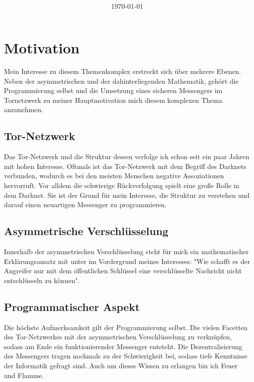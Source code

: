 \documentclass[a4paper,10pt,ngerman,
  headheight=28pt,]{scrartcl}
\title{\textbf{\Huge\Titel}}
\subtitle{\textbf{\Huge\SubTitel}}
\author{\LARGE \Author \\\\}
\author{\LARGE \School \\\\}
\date{\LARGE\today}
\begin{document}
\maketitle
\tableofcontents
\setcounter{page}{0}

\vspace{0.5cm}
\pagebreak

\linenumbers
\modulolinenumbers[5]

\section{Motivation}
Mein Interesse zu diesem Themenkomplex erstreckt sich über mehrere Ebenen. Neben der asymmetrischen und der dahinterliegenden Mathematik, gehört die Programmierung selbst und die Umsetzung eines sicheren Messengers im Tornetzwerk zu meiner Hauptmotivation mich diesem komplexen Thema anzunehmen.
\subsection{Tor-Netzwerk}
Das Tor-Netzwerk und die Struktur dessen verfolge ich schon seit ein paar Jahren mit hohen Interesse. Oftmals ist das Tor-Netzwerk mit dem Begriff des Darknets verbunden, wodurch es bei den meisten Menschen negative Assoziationen hervorruft. Vor alldem die schwierige Rückverfolgung spielt eine große Rolle in dem Darknet. Sie ist der Grund für mein Interesse, die Struktur zu verstehen und darauf einen neuartigen Messenger zu programmieren.

\subsection{Asymmetrische Verschlüsselung}
Innerhalb der asymmetrischen Verschlüsselung steht für mich ein mathematischer Erklärungsansatz mit unter im Vordergrund meines Interesses: "Wie schafft es der Angreifer nur mit dem öffentlichen Schlüssel eine verschlüsselte Nachricht nicht entschlüsseln zu können".

\subsection{Programmatischer Aspekt}
Die höchste Aufmerksamkeit gilt der Programmierung selbst. Die vielen Facetten des Tor-Netzwerkes mit der asymmetrischen Verschlüsselung zu verknüpfen, sodass am Ende ein funktionierender Messenger entsteht. Die Dezentralisierung des Messengers tragen nochmals zu der Schwierigkeit bei, sodass tiefe Kenntnisse der Informatik gefragt sind. Auch um dieses Wissen zu erlangen bin ich Feuer und Flamme.
\end{document}
